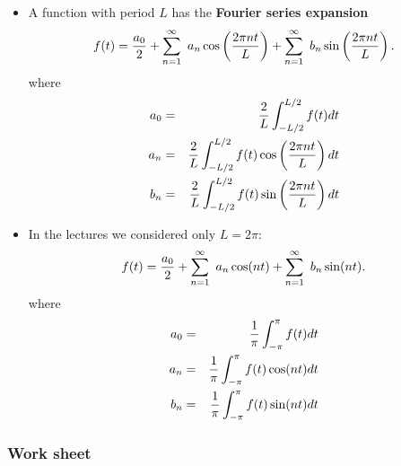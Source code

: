 \documentclass[12pt]{article}
\begin{document}
\begin{itemize}
\item A function with period $L$ has the {\bf Fourier series expansion}
$$f(t)={a_0\over2}+\sum_{n=1}^\infty ~a_n \cos\left({2\pi n t\over L}\right)+\sum_{n=1}^\infty ~b_n \sin\left({2\pi n t\over L}\right).$$
where 
\begin{eqnarray*}
a_0&=&\frac{2}{L}\int_{-L/2}^{L/2}f(t)dt\cr
a_n&=&\frac{2}{L}\int_{-L/2}^{L/2}f(t) \cos\left({2\pi n t\over L}\right) dt\cr
b_n&=&\frac{2}{L}\int_{-L/2}^{L/2}f(t) \sin\left({2\pi n t\over L}\right) dt
\end{eqnarray*}


\item In the lectures we considered only $L=2\pi$:
$$f(t)={a_0\over2}+\sum_{n=1}^\infty ~a_n \cos(n t)+\sum_{n=1}^\infty ~b_n \sin(n t).$$
where 
\begin{eqnarray*}
a_0&=&\frac{1}{\pi}\int_{-\pi}^{\pi}f(t)dt\cr
a_n&=&\frac{1}{\pi}\int_{-\pi}^{\pi}f(t) \cos(n t) dt\cr
b_n&=&\frac{1}{\pi}\int_{-\pi}^{\pi}f(t) \sin(n t) dt
\end{eqnarray*}

\end{itemize}
\subsubsection*{Work sheet}
\end{document}
